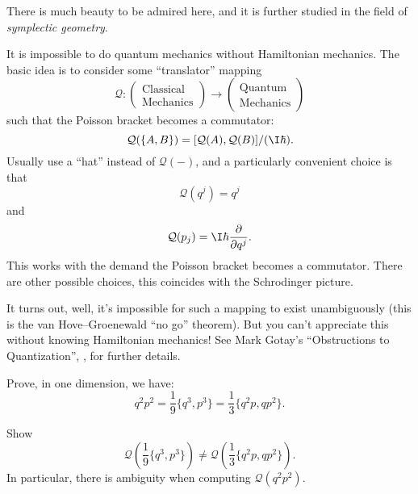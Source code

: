 There is much beauty to be admired here, and it is further studied in
the field of \emph{symplectic geometry}.

It is impossible to do quantum mechanics without Hamiltonian mechanics.
The basic idea is to consider some ``translator'' mapping
\begin{equation}
  \mathcal{Q}\colon\begin{pmatrix}\mbox{Classical}\\
  \mbox{Mechanics}
  \end{pmatrix}\to\begin{pmatrix}\mbox{Quantum}\\
  \mbox{Mechanics}
  \end{pmatrix}
\end{equation}
such that the Poisson bracket becomes a commutator:
\begin{equation}
\mathcal{Q}(\{A,B\}) = [\mathcal{Q}(A), \mathcal{Q}(B)]/(\I\hbar).
\end{equation}
Usually use a ``hat'' instead of $\mathcal{Q}(-)$, and a particularly
convenient choice is that
\begin{equation}
\mathcal{Q}(q^{j}) = q^{j}
\end{equation}
and
\begin{equation}
\mathcal{Q}(p_{j}) = \I\hbar\frac{\partial}{\partial q^{j}}.
\end{equation}
This works with the demand the Poisson bracket becomes a commutator.
There are other possible choices, this coincides with the Schrodinger picture.

It turns out, well, it's impossible for such a mapping to exist
unambiguously (this is the van Hove--Groenewald ``no go'' theorem). But
you can't appreciate this without knowing Hamiltonian mechanics!
See Mark Gotay's ``Obstructions to Quantization'', ,
for further details.


\begin{exercise}
Prove, in one dimension, we have:
\begin{equation}
q^{2}p^{2} = \frac{1}{9}\{q^{3},p^{3}\} = \frac{1}{3}\{q^{2}p,qp^{2}\}.
\end{equation}
\end{exercise}

\begin{exercise}
Show
\begin{equation}
\mathcal{Q}\left(\frac{1}{9}\{q^{3},p^{3}\}\right)
\neq \mathcal{Q}\left(\frac{1}{3}\{q^{2}p,qp^{2}\}\right).
\end{equation}
In particular, there is ambiguity when computing $\mathcal{Q}(q^{2}p^{2})$.
\end{exercise}


